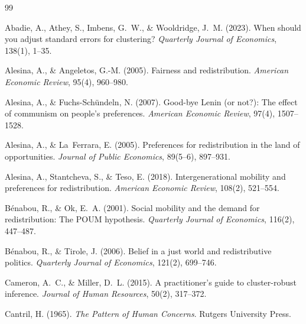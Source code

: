 \documentclass[11pt,a4paper]{article}
\begin{document}
\clearpage

\begin{thebibliography}{99}

Abadie, A., Athey, S., Imbens, G.~W., \& Wooldridge, J.~M. (2023).
\newblock When should you adjust standard errors for clustering?
\newblock \emph{Quarterly Journal of Economics}, 138(1), 1--35.

Alesina, A., \& Angeletos, G.-M. (2005).
\newblock Fairness and redistribution.
\newblock \emph{American Economic Review}, 95(4), 960--980.

Alesina, A., \& Fuchs-Sch\"undeln, N. (2007).
\newblock Good-bye Lenin (or not?): The effect of communism on people's preferences.
\newblock \emph{American Economic Review}, 97(4), 1507--1528.

Alesina, A., \& La~Ferrara, E. (2005).
\newblock Preferences for redistribution in the land of opportunities.
\newblock \emph{Journal of Public Economics}, 89(5--6), 897--931.

Alesina, A., Stantcheva, S., \& Teso, E. (2018).
\newblock Intergenerational mobility and preferences for redistribution.
\newblock \emph{American Economic Review}, 108(2), 521--554.

B\'enabou, R., \& Ok, E.~A. (2001).
\newblock Social mobility and the demand for redistribution: The POUM hypothesis.
\newblock \emph{Quarterly Journal of Economics}, 116(2), 447--487.

B\'enabou, R., \& Tirole, J. (2006).
\newblock Belief in a just world and redistributive politics.
\newblock \emph{Quarterly Journal of Economics}, 121(2), 699--746.

Cameron, A.~C., \& Miller, D.~L. (2015).
\newblock A practitioner's guide to cluster-robust inference.
\newblock \emph{Journal of Human Resources}, 50(2), 317--372.

Cantril, H. (1965).
\newblock \emph{The Pattern of Human Concerns}.
\newblock Rutgers University Press.


\end{thebibliography}
\end{document}
